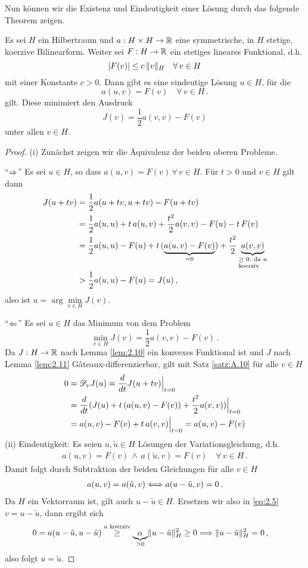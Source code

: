 Nun können wir die Existenz und Eindeutigkeit einer Lösung durch das folgende Theorem zeigen.

\begin{theorem}\label{theorem:2.12}
Es sei $H$ ein Hilbertraum und  $a : H \times H \rightarrow \mathbb{R}$ eine symmetrische, in $H$ stetige, koerzive Bilinearform. Weiter sei $F:H\rightarrow \mathbb{R}$ ein stetiges lineares Funktional, d.h.
\[
	\lvert F(v)\rvert \le c \, \lVert v\rVert_H \quad \forall \, v \in H
\]
mit einer Konstante $c >0$. Dann gibt es eine eindeutige Lösung $u \in H$, für die
\[
	a(u,v) = F(v) \quad \forall \, v \in H \, .
\]
gilt. Diese minimiert den Ausdruck
\[
	J(v) = \frac 1 2 a(v,v) - F(v)
\]
unter allen $v \in H$.
\end{theorem}

\begin{proof}
(i) Zunächst zeigen wir die Äquivalenz der beiden oberen Probleme.

"`$\Rightarrow$"' Es sei $u\in H$, so dass $a(u,v) = F(v) \, \forall \, v \in H$. Für $t>0$ und $v\in H$ gilt dann
\begin{align*}
	J(u+tv) & = \frac 1 2 a(u+tv,u+tv) -F(u+tv) \\
	& = \frac 1 2 a(u,u) + t \, a(u,v) + \frac {t^2} 2 a(v,v)-F(u)-t \, F(v) \\
	& = \frac 1 2 a(u,u)-F(u) + t\, (\underbrace{a(u,v)-F(v)}_{=0}) + \frac{t^2}2 \underbrace{a(v,v)}_{\parbox{1.2cm}{\scriptsize$\ge 0$, da $a$ koerziv}} \\
	& > \frac 1 2 a(u,u) - F(u) = J(u) \, ,
\end{align*}
also ist $u = \arg\min\limits_{v\in H} J(v)$.

"`$\Leftarrow$"' Es sei $u \in H$ das Minimum von dem Problem
\[
	\min_{v\in H} J(v) = \frac 1 2 a(v,v) -F(v) \, .
\]
Da $J:H\rightarrow \mathbb{R}$ nach Lemma \ref{lem:2.10} ein konvexes Funktional ist und $J$ nach Lemma \ref{lem:2.11} Gâteaux-differenzierbar, gilt mit Satz \ref{satz:A.10} für alle $v \in H$
\begin{align*}
	0& = \mathscr D_vJ(u) = \frac d{dt} J(u+tv)\Big|_{t=0} \\
	& = \frac d{dt}(J(u) + t \, (a(u,v)-F(v))+\frac{t^2}2 a(v,v))\Big|_{t=0} \\
	& = a(u,v)-F(v) + t \, a(v,v) \Big|_{t=0} = a(u,v)-F(v)
\end{align*}
(ii) Eindeutigkeit: Es seien $u,\tilde u \in H$ Lösungen der Variationsgleichung, d.h.
\begin{align*}
	a(u,v) = F(v) \, \wedge \, a(\tilde u,v) = F(v) \quad \forall \, v \in H \, .
\end{align*}
Damit folgt durch Subtraktion der beiden Gleichungen für alle $v \in H$
\begin{align}\label{eq:2.5}
	a(u,v) = a(\tilde u,v) \Longleftrightarrow a(u-\tilde u,v) = 0 \, .
\end{align}
Da $H$ ein Vektorraum ist, gilt auch $u-\tilde u \in H$. Ersetzen wir also in \eqref{eq:2.5} $v = u-\tilde u$, dann ergibt sich
\begin{align*}
	&0 = a(u-\tilde u,u-\tilde u) \stackrel{\scriptsize a\text{ koerziv}}\ge \underbrace{\alpha}_{>0} \lVert u-\tilde u\rVert_H^2 \ge 0 
	\Longrightarrow\lVert u-\tilde u\rVert_H^2 = 0 \, ,
\end{align*}
also folgt $u = \tilde u$.


\end{proof}
